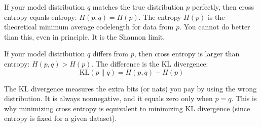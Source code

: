 If your model distribution $q$ matches the true distribution $p$ perfectly, then cross entropy equals entropy: $H(p, q) = H(p)$. The entropy $H(p)$ is the theoretical minimum average codelength for data from $p$. You cannot do better than this, even in principle. It is the Shannon limit.

If your model distribution $q$ differs from $p$, then cross entropy is larger than entropy: $H(p, q) > H(p)$. The difference is the KL divergence:
\begin{equation}
\text{KL}(p \| q) = H(p, q) - H(p)
\end{equation}

The KL divergence measures the extra bits (or nats) you pay by using the wrong distribution. It is always nonnegative, and it equals zero only when $p = q$. This is why minimizing cross entropy is equivalent to minimizing KL divergence (since entropy is fixed for a given dataset).

\vspace{1em}


